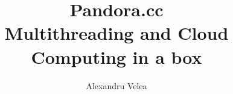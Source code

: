 \documentclass[a4paper, twoside, 12pt]{report}
\title{%
	Pandora.cc \\
	\large Multithreading and Cloud Computing in a box}
\author{Alexandru Velea}
\begin{document}


\begin{abstract}

\end{abstract}
\begin{abstract}

\end{abstract}

\tableofcontents
\listoffigures










\end{document}
